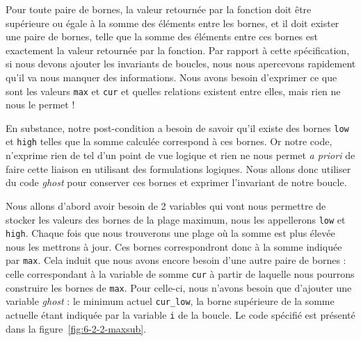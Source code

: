 \documentclass[12pt,francais,]{scrbook}
\begin{document}
Pour toute paire de bornes, la valeur retournée par la fonction doit
être supérieure ou égale à la somme des éléments entre les bornes, et il
doit exister une paire de bornes, telle que la somme des éléments entre
ces bornes est exactement la valeur retournée par la fonction. Par
rapport à cette spécification, si nous devons ajouter les invariants de
boucles, nous nous apercevons rapidement qu'il va nous manquer des
informations. Nous avons besoin d'exprimer ce que sont les valeurs
\texttt{max} et \texttt{cur} et quelles relations existent entre elles,
mais rien ne nous le permet !

En substance, notre post-condition a besoin de savoir qu'il existe des
bornes \texttt{low} et \texttt{high} telles que la somme calculée
correspond à ces bornes. Or notre code, n'exprime rien de tel d'un point
de vue logique et rien ne nous permet \emph{a priori} de faire cette
liaison en utilisant des formulations logiques. Nous allons donc
utiliser du code \emph{ghost} pour conserver ces bornes et exprimer
l'invariant de notre boucle.

Nous allons d'abord avoir besoin de 2 variables qui vont nous permettre
de stocker les valeurs des bornes de la plage maximum, nous les
appellerons \texttt{low} et \texttt{high}. Chaque fois que nous
trouverons une plage où la somme est plus élevée nous les mettrons à
jour. Ces bornes correspondront donc à la somme indiquée par
\texttt{max}. Cela induit que nous avons encore besoin d'une autre paire
de bornes : celle correspondant à la variable de somme \texttt{cur} à
partir de laquelle nous pourrons construire les bornes de \texttt{max}.
Pour celle-ci, nous n'avons besoin que d'ajouter une variable
\emph{ghost} : le minimum actuel \texttt{cur\_low}, la borne supérieure
de la somme actuelle étant indiquée par la variable \texttt{i} de la
boucle. Le code spécifié est présenté dans la figure~\ref{fig:6-2-2-maxsub}.
\end{document}
